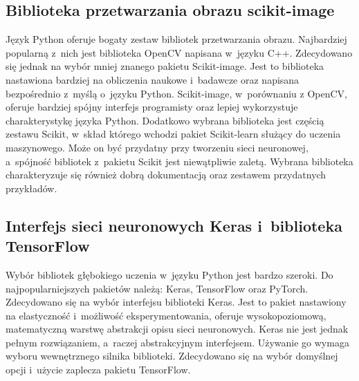 \subsection{Biblioteka przetwarzania obrazu scikit-image}
Język Python oferuje bogaty zestaw bibliotek przetwarzania obrazu.
Najbardziej popularną z~nich jest biblioteka OpenCV napisana w~języku C++.
Zdecydowano się jednak na wybór mniej znanego pakietu Scikit-image.
Jest to biblioteka nastawiona bardziej na obliczenia naukowe i~badawcze
oraz napisana bezpośrednio z~myślą o~języku Python.
Scikit-image, w~porównaniu z OpenCV, oferuje bardziej spójny interfejs
programisty oraz lepiej wykorzystuje charakterystykę języka Python.
Dodatkowo wybrana biblioteka jest częścią zestawu Scikit, w~skład
którego wchodzi pakiet Scikit-learn służący do uczenia maszynowego.
Może on być przydatny przy tworzeniu sieci neuronowej, a~spójność bibliotek
z~pakietu Scikit jest niewątpliwie zaletą.
Wybrana biblioteka charakteryzuje się również dobrą dokumentacją oraz
zestawem przydatnych przykładów.

\subsection{Interfejs sieci neuronowych Keras i~biblioteka TensorFlow}
Wybór bibliotek głębokiego uczenia w~języku Python jest bardzo szeroki.
Do najpopularniejszych pakietów należą: Keras, TensorFlow oraz PyTorch.
Zdecydowano się na wybór interfejsu biblioteki Keras.
Jest to pakiet nastawiony na elastyczność i~możliwość eksperymentowania,
oferuje wysokopoziomową, matematyczną warstwę abstrakcji opisu sieci
neuronowych.
Keras nie jest jednak pełnym rozwiązaniem, a~raczej abstrakcyjnym interfejsem.
Używanie go wymaga wyboru wewnętrznego silnika biblioteki.
Zdecydowano się na wybór domyślnej opcji i~użycie zaplecza pakietu TensorFlow.
